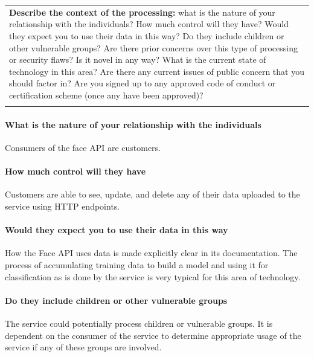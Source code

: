 \documentclass[12pt]{extarticle}
\begin{document}
\vspace{\baselineskip} 
\begin{table}[H] 
\centering 
\begin{tabular}{p{\linewidth}} 
\hline %
\multicolumn{1}{|p{\linewidth}|}{
\textbf{Describe the context of the processing: }what is the nature of your relationship with the individuals? How much control will they have? Would they expect you to use their data in this way? Do they include children or other vulnerable groups? Are there prior concerns over this type of processing or security flaws? Is it novel in any way? What is the current state of technology in this area? Are there any current issues of public concern that you should factor in? Are you signed up to any approved code of conduct or certification scheme (once any have been approved)?} \\ 
\hhline{-} %
\hhline{-} 
\end{tabular} 
\end{table} 

\paragraph{What is the nature of your relationship with the individuals} 
Consumers of the face API are customers. 

\paragraph{How much control will they have}
Customers are able to see, update, and delete any of their data uploaded to the service using HTTP endpoints.

\paragraph{Would they expect you to use their data in this way}
How the Face API uses data is made explicitly clear in its documentation.
The process of accumulating training data to build a model and using it for classification as is done by the service is very typical for this area of technology.

\paragraph{Do they include children or other vulnerable groups}
The service could potentially process children or vulnerable groups. 
It is dependent on the consumer of the service to determine appropriate usage of the service if any of these groups are involved.
\end{document}
